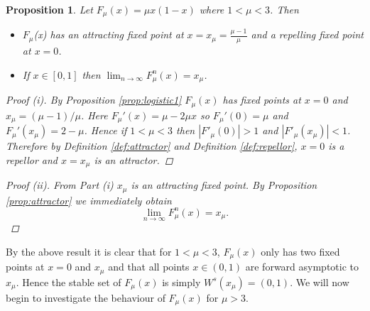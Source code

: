 \documentclass[11pt,a4paper,oneside]{memoir}
\theoremstyle{plain}
\newtheorem{prop}[thm]{Proposition}
\theoremstyle{definition}
\begin{document}
\begin{prop} \label{prop:logistic2}
    Let $F_\mu(x) = \mu x (1-x)$ where $1 < \mu < 3$. Then
    \begin{itemize}
        \item[(i)] $F_\mu$(x) has an attracting fixed point at $x = x_\mu = \frac{\mu - 1}{\mu}$ and a repelling fixed point at $x = 0$.
        \item[(ii)] If $x \in [0, 1]$ then $\lim_{n \to \infty} F_\mu^n(x) = x_\mu$.
    \end{itemize}
    \begin{proof}[Proof (i)]
        By Proposition \ref{prop:logistic1} $F_\mu(x)$ has fixed points at $x = 0$ and $x_\mu = (\mu - 1) / \mu$. Here $F_\mu'(x) = \mu - 2\mu x$ so $F_\mu'(0) = \mu$ and $F_\mu'(x_\mu) = 2 - \mu$. Hence if $1 < \mu < 3$ then $|F'_\mu(0)| > 1$ and $|F'_\mu(x_\mu)| < 1$. Therefore by Definition \ref{def:attractor} and Definition \ref{def:repellor}, $x = 0$ is a repellor and $x = x_\mu$ is an attractor.
    \end{proof}
    \begin{proof}[Proof (ii)]
        From Part (i) $x_\mu$ is an attracting fixed point. By Proposition \ref{prop:attractor} we immediately obtain \[\lim_{n \to \infty}F_\mu^n(x) = x_\mu.\]
    \end{proof}
\end{prop}

By the above result it is clear that for $1 < \mu < 3$, $F_\mu(x)$ only has two fixed points at $x = 0$ and $x_\mu$ and that all points $x \in (0, 1)$ are forward asymptotic to $x_\mu$. Hence the stable set of $F_\mu(x)$ is simply $W^s(x_\mu) = (0, 1)$. We will now begin to investigate the behaviour of $F_\mu(x)$ for $\mu > 3$.
\end{document}
